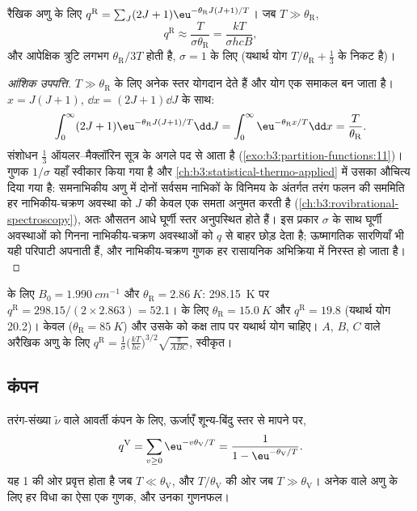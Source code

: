 \begin{proposition}[घूर्णी विभाजन फलन]\label{prop:b3:partition-functions:q-rot}
रैखिक अणु के लिए $q^{\mathrm R} = \sum_J(2J+1)\eu^{-\theta_{\mathrm R}J(J+1)/T}$। जब $T \gg
\theta_{\mathrm R}$,
\[
  q^{\mathrm R} \approx \frac{T}{\sigma\theta_{\mathrm R}} = \frac{kT}{\sigma hcB},
\]
और आपेक्षिक त्रुटि लगभग $\theta_{\mathrm R}/3T$ होती है, $\sigma = 1$ के लिए (यथार्थ योग
$T/\theta_{\mathrm R} + \frac13$ के निकट है)।
\end{proposition}

\begin{proof}[आंशिक उपपत्ति]
$T \gg \theta_{\mathrm R}$ के लिए अनेक स्तर योगदान देते हैं और योग एक समाकल बन जाता है।
$x = J(J+1)$, $\dd x = (2J+1)\dd J$ के साथ:
\[
  \int_0^\infty(2J+1)\eu^{-\theta_{\mathrm R}J(J+1)/T}\dd J = \int_0^\infty\eu^{-\theta_{\mathrm R}x/T}\dd x
  = \frac{T}{\theta_{\mathrm R}}.
\]
संशोधन $\frac13$ ऑयलर--मैक्लॉरिन सूत्र के अगले पद से आता है
(\cref{exo:b3:partition-functions:11})। गुणक $1/\sigma$ यहाँ स्वीकार किया गया है और
\cref{ch:b3:statistical-thermo-applied} में उसका औचित्य दिया गया है: समनाभिकीय अणु में
दोनों सर्वसम नाभिकों के विनिमय के अंतर्गत तरंग फलन की सममिति
हर नाभिकीय-चक्रण अवस्था को $J$ की केवल एक समता अनुमत करती है
(\cref{ch:b3:rovibrational-spectroscopy}), अतः औसतन आधे घूर्णी
स्तर अनुपस्थित होते हैं। इस प्रकार $\sigma$ के साथ घूर्णी अवस्थाओं को गिनना
नाभिकीय-चक्रण अवस्थाओं को $q$ से बाहर छोड़ देता है; ऊष्मागतिक सारणियाँ भी यही
परिपाटी अपनाती हैं, और नाभिकीय-चक्रण गुणक हर रासायनिक
अभिक्रिया में निरस्त हो जाता है।
\end{proof}

 के लिए $B_0 = \qty{1.990}{cm^{-1}}$ और $\theta_{\mathrm R} = \qty{2.86}{K}$: \qty{298.15}{K} पर
$q^{\mathrm R} = 298.15/(2\times2.863) = 52.1$।  के लिए $\theta_{\mathrm R} = \qty{15.0}{K}$ और
$q^{\mathrm R} = 19.8$ (यथार्थ योग 20.2)। केवल  ($\theta_{\mathrm R} = \qty{85}{K}$) और उसके 
को कक्ष ताप पर यथार्थ योग चाहिए। 
$A$, $B$, $C$ वाले अरैखिक अणु के लिए $q^{\mathrm R} = \frac{1}{\sigma}\bigl(\frac{kT}{hc}\bigr)^{3/2}\sqrt{\frac{\pi}{ABC}}$, स्वीकृत।

\subsection*{कंपन}

\begin{proposition}[कंपनिक विभाजन फलन]\label{prop:b3:partition-functions:q-vib}
तरंग-संख्या $\tilde\nu$ वाले आवर्ती कंपन के लिए, ऊर्जाएँ
शून्य-बिंदु स्तर से मापने पर,
\[
  q^{\mathrm V} = \sum_{v\ge0}\eu^{-v\theta_{\mathrm V}/T} = \frac{1}{1 - \eu^{-\theta_{\mathrm V}/T}} .
\]
यह 1 की ओर प्रवृत्त होता है जब $T \ll \theta_{\mathrm V}$, और $T/\theta_{\mathrm V}$ की ओर जब $T \gg \theta_{\mathrm V}$। अनेक
 वाले अणु के लिए हर विधा का ऐसा एक गुणक, और उनका गुणनफल।
\end{proposition}


